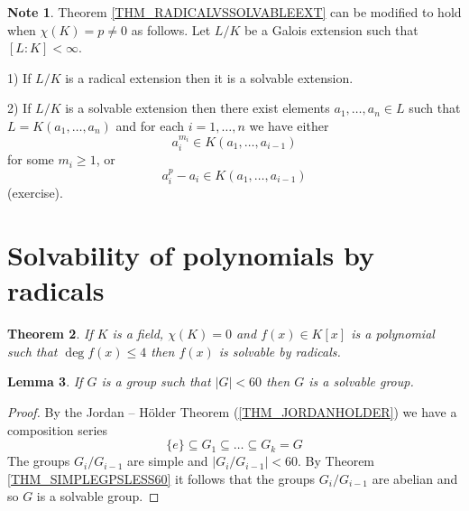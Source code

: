 \documentclass[12pt, letterpaper, oneside]{article}
\theoremstyle{plain}
\newtheorem{theorem}{Theorem}[section]
\newtheorem{lemma}[theorem]{Lemma}
\theoremstyle{definition}
\newtheorem{note}[theorem]{Note}
\newcommand{\vs}{\vskip 5mm}
\begin{document}
\vs\vs


\begin{note}
Theorem \ref{THM_RADICALVSSOLVABLEEXT} can be modified to hold  when  $\chi(K)=p \neq 0$
as follows. Let $L/K$ be a Galois extension such that  $[L:K] < \infty$.  

1) If $L/K$ is a radical extension then it is a solvable extension. 

2) If $L/K$ is a solvable extension then there exist elements 
$a_{1}, \dots, a_{n} \in L$ such that $L=K(a_{1}, \dots, a_{n})$ and for each $i=1, \dots, n$ we have 
either 
$$a_{i}^{m_{i}} \in K(a_{1}, \dots, a_{i-1})$$
for some $m_{i}\geq 1$,  or
$$a_{i}^{p}-a_{i} \in K(a_{1}, \dots, a_{i-1})$$
(exercise).
\end{note}






\newpage
\section{Solvability of polynomials by radicals}
\label{SEC_SOLPOLYBYRAD}



\begin{theorem}
\label{THM_POLYSOLVLESSEQ4}
If $K$ is a field, $\chi(K)=0$ and $f(x)\in K[x]$ is a polynomial such that $\deg f(x) \leq 4$
then $f(x)$ is solvable by radicals. 
\end{theorem}

\vs\vs

\begin{lemma}
\label{LEMMA_LESS60SOLVGP}
If $G$ is a group such that $|G| < 60$ then $G$ is a solvable group. 
\end{lemma}

\vs 

\begin{proof}
By the Jordan -- H\"{o}lder Theorem (\ref{THM_JORDANHOLDER}) we have a composition 
series 
$$\{e\}\subseteq G_{1}\subseteq {\dots}\subseteq  G_{k} = G$$
The groups $G_{i}/G_{i-1}$ are simple and $|G_{i}/G_{i-1}| < 60$. 
By Theorem  \ref{THM_SIMPLEGPSLESS60} it follows that the groups $G_{i}/G_{i-1}$ 
are abelian and so  $G$ is a solvable group. 
\end{proof}

\vs\vs
\end{document}

